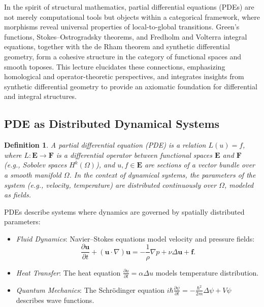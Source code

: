 \documentclass{article}
\theoremstyle{plain}
\newtheorem{definition}{Definition}[section]
\newcommand{\cat}[1]{\mathbf{#1}}
\begin{document}
In the spirit of structural mathematics, partial differential equations (PDEs)
are not merely computational tools but objects within a categorical framework,
where morphisms reveal universal properties of local-to-global transitions.
Green's functions, Stokes--Ostrogradsky theorems, and Fredholm and Volterra
integral equations, together with the de Rham theorem and synthetic differential geometry,
form a cohesive structure in the category of functional spaces and smooth toposes.
This lecture elucidates these connections, emphasizing homological and
operator-theoretic perspectives, and integrates insights from synthetic
differential geometry to provide an axiomatic foundation for differential
and integral structures.

\subsection{PDE as Distributed Dynamical Systems}

\begin{definition}
A \emph{partial differential equation} (PDE) is a relation \(L(u) = f\),
where \(L: \cat{E} \to \cat{F}\) is a differential operator between functional
spaces \(\cat{E}\) and \(\cat{F}\) (e.g., Sobolev spaces \(H^k(\Omega)\)),
and \(u, f \in \cat{E}\) are sections of a vector bundle over a smooth manifold \(\Omega\).
In the context of dynamical systems, the parameters of the system (e.g., velocity, temperature)
are distributed continuously over \(\Omega\), modeled as fields.
\end{definition}

PDEs describe systems where dynamics are governed by spatially distributed parameters:
\begin{itemize}
    \item \emph{Fluid Dynamics}: Navier--Stokes equations model velocity and pressure fields: \[ \frac{\partial \mathbf{u}}{\partial t} + (\mathbf{u} \cdot \nabla) \mathbf{u} = -\frac{1}{\rho} \nabla p + \nu \Delta \mathbf{u} + \mathbf{f}. \]
    \item \emph{Heat Transfer}: The heat equation \(\frac{\partial u}{\partial t} = \alpha \Delta u\) models temperature distribution.
    \item \emph{Quantum Mechanics}: The Schrödinger equation \(i\hbar \frac{\partial \psi}{\partial t} = -\frac{\hbar^2}{2m} \Delta \psi + V\psi\) describes wave functions.
\end{itemize}
\end{document}
